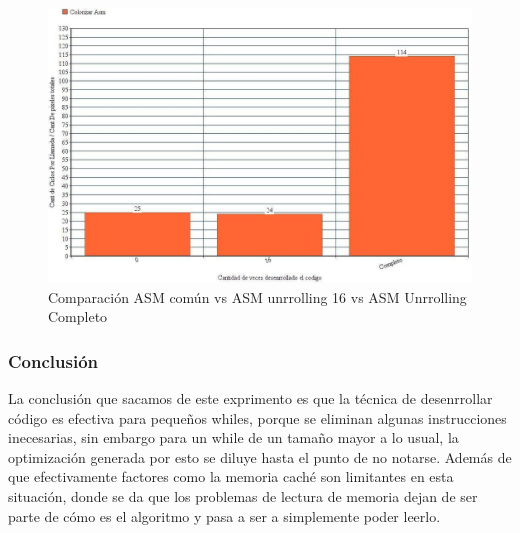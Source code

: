 \begin{figure}[H]
\centering
\captionsetup{justification=centering}
	\includegraphics[width = 16.5 cm, height = 9 cm]{imagenes/unroll.jpg}
	\caption[center]{Comparación ASM común vs ASM unrrolling 16 vs ASM Unrrolling Completo}
\end{figure}
\medskip
	
\subsubsection{Conclusión}
\par{La conclusión que sacamos de este exprimento es que la técnica de desenrrollar código es efectiva para pequeños whiles, porque se eliminan algunas instrucciones inecesarias, sin embargo para un while de un tamaño mayor a lo usual, la optimización generada por esto se diluye hasta el punto de no notarse. Además de que efectivamente factores como la memoria caché son limitantes en esta situación, donde se da que los problemas de lectura de memoria dejan de ser parte de cómo es el algoritmo y pasa a ser a simplemente poder leerlo.}